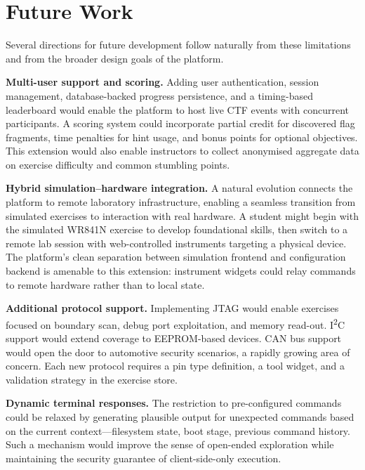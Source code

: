 \section{Future Work}\label{sec:future}

Several directions for future development follow naturally from these limitations and from the broader design goals of the platform.

\textbf{Multi-user support and scoring.} Adding user authentication, session management, database-backed progress persistence, and a timing-based leaderboard would enable the platform to host live CTF events with concurrent participants. A scoring system could incorporate partial credit for discovered flag fragments, time penalties for hint usage, and bonus points for optional objectives. This extension would also enable instructors to collect anonymised aggregate data on exercise difficulty and common stumbling points.

\textbf{Hybrid simulation--hardware integration.} A natural evolution connects the platform to remote laboratory infrastructure, enabling a seamless transition from simulated exercises to interaction with real hardware. A student might begin with the simulated WR841N exercise to develop foundational skills, then switch to a remote lab session with web-controlled instruments targeting a physical device. The platform's clean separation between simulation frontend and configuration backend is amenable to this extension: instrument widgets could relay commands to remote hardware rather than to local state.

\textbf{Additional protocol support.} Implementing JTAG would enable exercises focused on boundary scan, debug port exploitation, and memory read-out. I\textsuperscript{2}C support would extend coverage to EEPROM-based devices. CAN bus support would open the door to automotive security scenarios, a rapidly growing area of concern. Each new protocol requires a pin type definition, a tool widget, and a validation strategy in the exercise store.

\textbf{Dynamic terminal responses.} The restriction to pre-configured commands could be relaxed by generating plausible output for unexpected commands based on the current context---filesystem state, boot stage, previous command history. Such a mechanism would improve the sense of open-ended exploration while maintaining the security guarantee of client-side-only execution.

